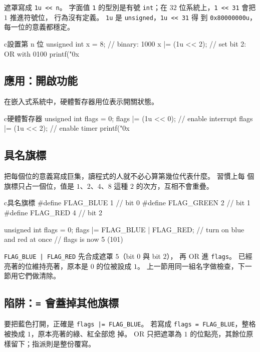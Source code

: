 遮罩寫成 \texttt{1u << n}。 字面值 \texttt{1} 的型別是有號
\texttt{int}；在 $32$ 位系統上，\texttt{1 << 31} 會把 $1$ 推進符號位，
行為沒有定義。 \texttt{1u} 是 \texttt{unsigned}，\texttt{1u << 31} 得
到 \texttt{0x80000000u}，每一位的意義都穩定。

\begin{code}{c}{設置第 n 位}
unsigned int x = 8;   // binary: 1000
x |= (1u << 2);      // set bit 2: OR with 0100
printf("0x%
\end{code}

\subsection{應用：開啟功能}

在嵌入式系統中，硬體暫存器用位表示開關狀態。

\begin{code}{c}{硬體暫存器}
unsigned int flags = 0;
flags |= (1u << 0);  // enable interrupt
flags |= (1u << 2);  // enable timer
printf("0x%
\end{code}

\subsection{具名旗標}

把每個位的意義寫成巨集，讀程式的人就不必心算第幾位代表什麼。 習慣上每
個旗標只占一個位，值是 $1$、$2$、$4$、$8$ 這種 $2$ 的次方，互相不會重疊。

\begin{code}{c}{具名旗標}
#define FLAG_BLUE  1    // bit 0
#define FLAG_GREEN 2    // bit 1
#define FLAG_RED   4    // bit 2

unsigned int flags = 0;
flags |= FLAG_BLUE | FLAG_RED;   // turn on blue and red at once
// flags is now 5 (101)
\end{code}

\texttt{FLAG\_BLUE | FLAG\_RED} 先合成遮罩 $5$（bit $0$ 與 bit $2$），
再 OR 進 \texttt{flags}。 已經亮著的位維持亮著，原本是 $0$ 的位被設成
$1$。 上一節用同一組名字做檢查，下一節用它們做清除。

\subsection{陷阱：\texttt{=} 會蓋掉其他旗標}

要把藍色打開，正確是 \texttt{flags |= FLAG\_BLUE}。 若寫成
\texttt{flags = FLAG\_BLUE}，整格被換成 $1$，原本亮著的綠、紅全部熄
掉。 OR 只把遮罩為 $1$ 的位點亮，其餘位原樣留下；指派則是整份覆寫。

